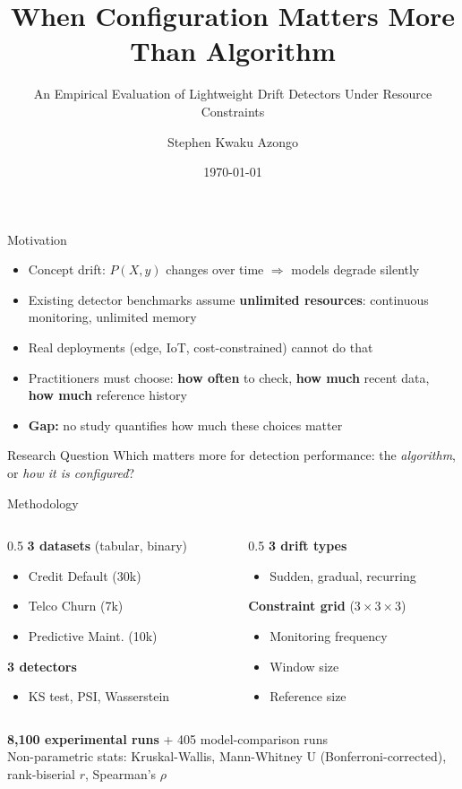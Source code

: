 \documentclass{beamer}
\title[Configuration vs. Algorithm]{When Configuration Matters More Than Algorithm}
\subtitle{An Empirical Evaluation of Lightweight Drift Detectors Under Resource Constraints}
\author{Stephen Kwaku Azongo}
\institute{Department of Computer Science, University of Ghana}
\date{\today}
\begin{document}
\frame{\titlepage}

\begin{frame}{Motivation}
\begin{itemize}
  \item Concept drift: $P(X,y)$ changes over time $\Rightarrow$ models degrade silently
  \item Existing detector benchmarks assume \textbf{unlimited resources}: continuous monitoring, unlimited memory
  \item Real deployments (edge, IoT, cost-constrained) cannot do that
  \item Practitioners must choose: \textbf{how often} to check, \textbf{how much} recent data, \textbf{how much} reference history
  \item \textbf{Gap:} no study quantifies how much these choices matter
\end{itemize}
\vspace{0.5em}
\begin{block}{Research Question}
Which matters more for detection performance: the \emph{algorithm}, or \emph{how it is configured}?
\end{block}
\end{frame}

\begin{frame}{Methodology}
\begin{columns}[T]
\begin{column}{0.5\textwidth}
\textbf{3 datasets} (tabular, binary)
\begin{itemize}
  \item Credit Default (30k)
  \item Telco Churn (7k)
  \item Predictive Maint. (10k)
\end{itemize}
\textbf{3 detectors}
\begin{itemize}
  \item KS test, PSI, Wasserstein
\end{itemize}
\end{column}
\begin{column}{0.5\textwidth}
\textbf{3 drift types}
\begin{itemize}
  \item Sudden, gradual, recurring
\end{itemize}
\textbf{Constraint grid} ($3{\times}3{\times}3$)
\begin{itemize}
  \item Monitoring frequency
  \item Window size
  \item Reference size
\end{itemize}
\end{column}
\end{columns}
\vspace{1em}
\begin{center}
\textbf{8,100 experimental runs} + 405 model-comparison runs\\[4pt]
\small Non-parametric stats: Kruskal-Wallis, Mann-Whitney U (Bonferroni-corrected),\\ rank-biserial $r$, Spearman's $\rho$
\end{center}
\end{frame}
\end{document}
